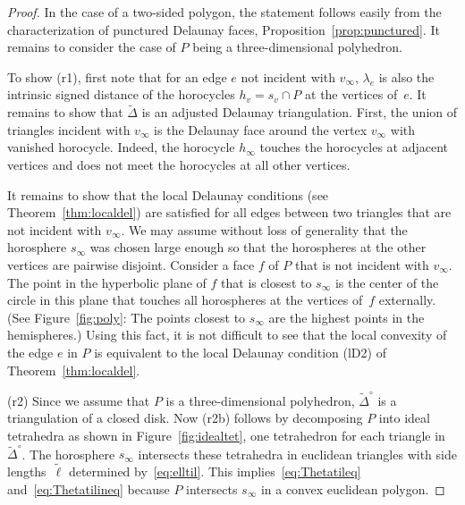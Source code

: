 \documentclass[a4paper, 11pt]{article}
\newcommand{\Deltil}{\widetilde{\Delta}}
\newcommand{\Deltilo}{\Deltil^{\circ}}
\newcommand{\elltil}{\tilde{\ell}}
\theoremstyle{plain}
\theoremstyle{definition}
\begin{document}
\begin{proof}
  In the case of a two-sided polygon, the statement follows easily
  from the characterization of punctured Delaunay faces,
  Proposition~\ref{prop:punctured}. It remains to consider the case
  of $P$ being a three-dimensional polyhedron.

  To show (r1), first note that for an edge $e$ not incident with
  $v_{\infty}$, $\lambda_{e}$ is also the intrinsic signed distance of
  the horocycles $h_{v}=s_{v}\cap P$ at the vertices of~$e$. It
  remains to show that $\Deltil$ is an adjusted Delaunay
  triangulation. First, the union of triangles incident with
  $v_{\infty}$ is the Delaunay face around the vertex $v_{\infty}$
  with vanished horocycle. Indeed, the horocycle $h_{\infty}$ touches
  the horocycles at adjacent vertices and does not meet the horocycles
  at all other vertices.
    
  It remains to show that the local Delaunay conditions (see
  Theorem~\ref{thm:localdel}) are satisfied for all edges between two
  triangles that are not incident with $v_{\infty}$. We may assume
  without loss of generality that the horosphere $s_{\infty}$ was
  chosen large enough so that the horospheres at the other vertices
  are pairwise disjoint. Consider a face $f$ of $P$ that is not
  incident with $v_{\infty}$. The point in the hyperbolic plane of $f$
  that is closest to $s_{\infty}$ is the center of the circle in this
  plane that touches all horospheres at the vertices of~$f$
  externally. (See Figure~\ref{fig:poly}: The points closest to
  $s_{\infty}$ are the highest points in the hemispheres.) Using this
  fact, it is not difficult to see that the local convexity of the
  edge $e$ in $P$ is equivalent to the local Delaunay condition (lD2)
  of Theorem~\ref{thm:localdel}.
  
  (r2) Since we assume that $P$ is a three-dimensional polyhedron,
  $\Deltilo$ is a triangulation of a closed disk. Now (r2b) follows by
  decomposing $P$ into ideal tetrahedra as shown in
  Figure~\ref{fig:idealtet}, one tetrahedron for each triangle in
  $\Deltilo$. The horosphere $s_{\infty}$ intersects these tetrahedra
  in euclidean triangles with side lengths~$\elltil$ determined
  by~\eqref{eq:elltil}. This implies~\eqref{eq:Thetatileq}
  and~\eqref{eq:Thetatilineq} because $P$ intersects $s_{\infty}$ in a
  convex euclidean polygon.
\end{proof}
\end{document}
